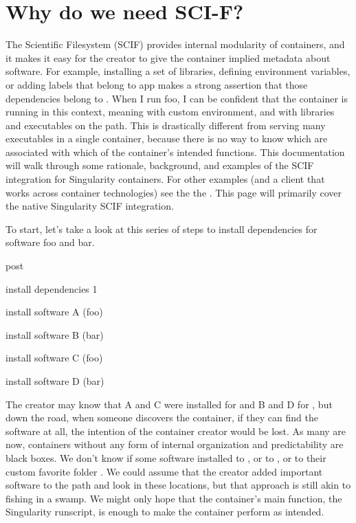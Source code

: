 \documentclass[letterpaper,10pt,english]{sphinxmanual}
\begin{document}
\section{Why do we need SCI-F?}
\label{\detokenize{reproducible_scif_apps:why-do-we-need-sci-f}}\label{\detokenize{reproducible_scif_apps:sec-scifapps}}
The Scientific Filesystem (SCIF) provides internal modularity of
containers, and it makes it easy for the creator to give the container
implied metadata about software. For example, installing a set of
libraries, defining environment variables, or adding labels that
belong to app  makes a strong assertion that those dependencies belong
to  . When I run foo, I can be confident that the container is running
in this context, meaning with  custom environment, and with  libraries
and executables on the path. This is drastically different from
serving many executables in a single container, because there is no
way to know which are associated with which of the container’s
intended functions. This documentation will walk through some
rationale, background, and examples of the SCIF integration for
Singularity containers. For other examples (and a client that works
across container technologies) see the the .
This page will primarily cover the native Singularity SCIF
integration.

To start, let’s take a look at this series of steps to install
dependencies for software foo and bar.

%
\begin{sphinxVerbatim}[commandchars=\\\{\}]
\PYGZpc{}post


\PYGZsh{} install dependencies 1

\PYGZsh{} install software A (foo)

\PYGZsh{} install software B (bar)

\PYGZsh{} install software C (foo)

\PYGZsh{} install software D (bar)
\end{sphinxVerbatim}

The creator may know that A and C were installed for  and B and D for  ,
but down the road, when someone discovers the container, if they can
find the software at all, the intention of the container creator would
be lost. As many are now, containers without any form of internal
organization and predictability are black boxes. We don’t know if some
software installed to  , or to   , or to their custom favorite folder  . We
could assume that the creator added important software to the path and
look in these locations, but that approach is still akin to fishing in a
swamp. We might only hope that the container’s main function, the
Singularity runscript, is enough to make the container perform as
intended.
\end{document}
